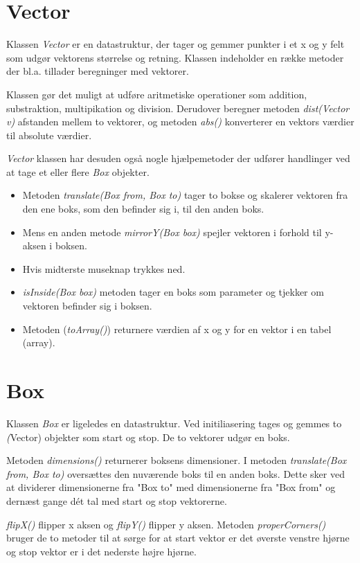 \section{Vector}

Klassen \emph{Vector} er en datastruktur, der tager og gemmer punkter i et x og y felt som udgør vektorens størrelse og retning. Klassen indeholder en række metoder der bl.a. tillader beregninger med vektorer.

Klassen gør det muligt at udføre aritmetiske operationer som addition, substraktion, multipikation og division. Derudover beregner metoden \emph{dist(Vector v)} afstanden mellem to vektorer, og metoden \emph{abs()} konverterer en vektors værdier til absolute værdier.

\emph{Vector} klassen har desuden også nogle hjælpemetoder der udfører handlinger ved at tage et eller flere \emph{Box} objekter.

\begin{itemize}
	\item Metoden \emph{translate(Box from, Box to)} tager to bokse og skalerer vektoren fra den ene boks, som den befinder sig i, til den anden boks.
	\item Mens en anden metode \emph{mirrorY(Box box)} spejler vektoren i forhold til y-aksen i boksen.
	\item Hvis midterste museknap trykkes ned.
	\item \emph{isInside(Box box)} metoden tager en boks som parameter og tjekker om vektoren befinder sig i boksen.
	\item Metoden (\emph{toArray()}) returnere værdien af x og y for en vektor i en tabel (array).
\end{itemize}

\section{Box}

Klassen \emph{Box} er ligeledes en datastruktur. Ved initiliasering tages og gemmes to \emph(Vector) objekter som start og stop. De to vektorer udgør en boks.

Metoden \emph{dimensions()} returnerer boksens dimensioner. I metoden \emph{translate(Box from, Box to)} oversættes den nuværende boks til en anden boks. Dette sker ved at dividerer dimensionerne fra "Box to" med dimensionerne fra "Box from" og dernæst gange dét tal med start og stop vektorerne.

\emph{flipX()} flipper x aksen og \emph{flipY()} flipper y aksen. Metoden \emph{properCorners()} bruger de to metoder til at sørge for at start vektor er det øverste venstre hjørne og stop vektor er i det nederste højre hjørne.

